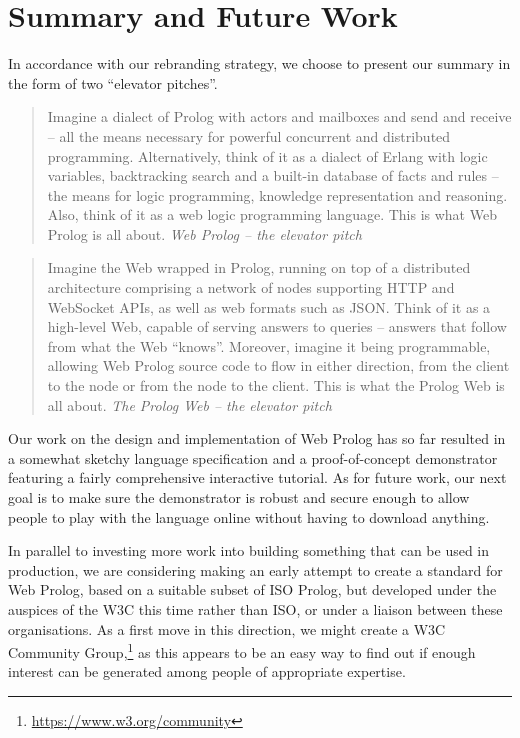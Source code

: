 \documentclass{tlp}
\begin{document}
\section{Summary and Future Work}\label{sec:summary}

\noindent In accordance with our rebranding strategy, we choose to present our summary in the form of two ``elevator pitches''.

\vspace{0.3cm}

\begin{quote}
Imagine a dialect of Prolog with actors and mailboxes and send and receive -- all the means necessary for powerful concurrent and distributed programming.  Alternatively, think of it as a dialect of Erlang with logic variables, backtracking search and a built-in database of facts and rules -- the means for logic programming, knowledge representation and reasoning. Also, think of it as a web logic programming language. This is what Web Prolog is all about.
\flushright\textit{Web Prolog -- the elevator pitch}
\end{quote}

\vspace{0.2cm}

\begin{quote}
Imagine the Web wrapped in Prolog, running on top of a distributed architecture comprising a network of nodes supporting HTTP and WebSocket APIs, as well as web formats such as JSON. Think of it as a high-level Web, capable of serving answers to queries -- answers that follow from what the Web ``knows''. Moreover, imagine it being programmable, allowing Web Prolog source code to flow in either direction, from the client to the node or from the node to the client. This is what the Prolog Web is all about.
\vspace{2mm}
\flushright\textit{The Prolog Web -- the elevator pitch}
\end{quote}

\vspace{2mm}

\noindent Our work on the design and implementation of Web Prolog has so far resulted in a somewhat sketchy language specification and a proof-of-concept demonstrator featuring a fairly comprehensive interactive tutorial. As for future work, our next goal is to make sure the demonstrator is robust and secure enough to allow people to play with the language online without having to download anything.

In parallel to investing more work into building something that can be used in production, we are considering making an early attempt to create a standard for Web Prolog, based on a suitable subset of ISO Prolog, but developed under the auspices of the W3C this time rather than ISO, or under a liaison between these organisations. As a first move in this direction, we might create a W3C Community Group,\footnote{\url{https://www.w3.org/community}} as this appears to be an easy way to find out if enough interest can be generated among people of appropriate expertise.
\end{document}
